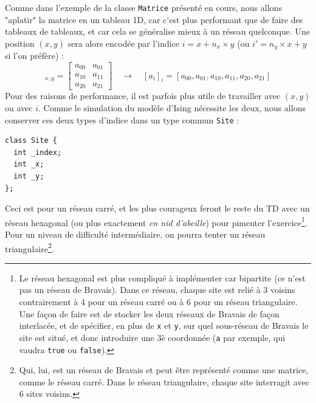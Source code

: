 \documentclass{book}
\newcommand{\inline}[1]{\texttt{#1}}
\begin{document}
Comme dans l'exemple de la classe \inline{Matrice} présenté en cours, nous allons "aplatir" la matrice en un tableau 1D, car c'est plus performant que de faire des tableaux de tableaux, et car cela se généralise mieux à un réseau quelconque. Une position $(x,y)$ sera alors encodée par l'indice $i = x + n_x \times y$ (ou $i' = n_y \times x + y$ si l'on préfère) :
\begin{equation*}
[a_{x y}]_{x, y} = \left[\begin{array}{cc}
     a_{0 0} & a_{0 1}\\
     a_{1 0} & a_{1 1}\\
     a_{2 0} & a_{2 1}
   \end{array}\right] \quad \longrightarrow \quad [a_i]_i = \left[a_{0 0}, a_{0 1},
   a_{1 0}, a_{1 1}, a_{2 0}, a_{2 1}\right] 
\end{equation*}
Pour des raisons de performance, il est parfois plus utile de travailler avec $(x,y)$ ou avec $i$. Comme le simulation du modèle d'Ising nécessite les deux, nous allons conserver ces deux types d'indice dans un type commun \inline{Site} :
\begin{verbatim}
class Site {
  int _index;
  int _x;
  int _y;
};
\end{verbatim}
Ceci est pour un réseau carré, et les plus courageux feront le reste du TD avec un réseau hexagonal (ou plus exactement \emph{en nid d'abeille}) pour pimenter l'exercice\footnote{Le réseau hexagonal est plus compliqué à implémenter car bipartite (ce n'est pas un réseau de Bravais). Dans ce réseau, chaque site est relié à 3 voisins contrairement à 4 pour un réseau carré ou à 6 pour un réseau triangulaire. Une façon de faire est de stocker les deux réseaux de Bravais de façon interlacée, et de spécifier, en plus de \inline{x} et \inline{y}, sur quel sous-réseau de Bravais le site est situé, et donc introduire une 3è coordonnée (\inline{a} par exemple, qui vaudra \inline{true} ou \inline{false}).}. Pour un niveau de difficulté intermédiaire, on pourra tenter un réseau triangulaire\footnote{Qui, lui, est un réseau de Bravais et peut être représenté comme une matrice, comme le réseau carré. Dans le réseau triangulaire, chaque site interragit avec 6 sites voisins.}.
\end{document}
